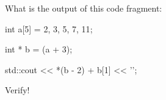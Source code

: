 What is the output of this code fragment:



\begin{consolethree}[escapeinside=||]

int a[5] = {2, 3, 5, 7, 11};

int * b = (a + 3);

std::cout << *(b - 2) + b[1] << '\n';

\end{consolethree}



Verify!

